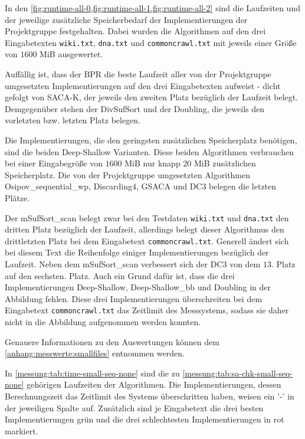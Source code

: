 %
%

In den \cref{fig:runtime-all-0,fig:runtime-all-1,fig:runtime-all-2} sind die Laufzeiten und der jeweilige zusätzliche Speicherbedarf der Implementierungen der Projektgruppe festgehalten. Dabei wurden die Algorithmen auf den drei Eingabetexten \texttt{wiki.txt}, \texttt{dna.txt} und \texttt{commoncrawl.txt} mit jeweils einer Größe von $1600$ MiB ausgewertet.

Auffällig ist, dass der BPR die beste Laufzeit aller von der Projektgruppe umgesetzten Implementierungen auf den drei Eingabetexten aufweist - dicht gefolgt von SACA-K, der jeweils den zweiten Platz bezüglich der Laufzeit belegt. Demgegenüber stehen der DivSufSort und der Doubling, die jeweils den vorletzten bzw. letzten Platz belegen.

Die Implementierungen, die den geringsten zusätzlichen Speicherplatz benötigen, sind die beiden Deep-Shallow Varianten. Diese beiden Algorithmen verbrauchen bei einer Eingabegröße von $1600$ MiB nur knapp $20$ MiB zusätzlichen Speicherplatz. Die von der Projektgruppe umgesetzten Algorithmen Osipov\_sequential\_wp, Discarding4, GSACA und DC3 belegen die letzten Plätze.

Der mSufSort\_scan belegt zwar bei den Testdaten \texttt{wiki.txt} und \texttt{dna.txt} den dritten Platz bezüglich der Laufzeit, allerdings belegt dieser Algorithmus den drittletzten Platz bei dem Eingabetext \texttt{commoncrawl.txt}. Generell ändert sich bei diesem Text die Reihenfolge einiger Implementierungen bezüglich der Laufzeit. Neben dem mSufSort\_scan verbessert sich der DC3 von dem $13$. Platz auf den sechsten. Platz. Auch ein Grund dafür ist, dass die drei Implementierungen Deep-Shallow, Deep-Shallow\_bb und Doubling in der Abbildung fehlen. Diese drei Implementierungen überschreiten bei dem Eingabetext \texttt{commoncrawl.txt} das Zeitlimit des Messsystems, sodass sie daher nicht in die Abbildung aufgenommen werden konnten.

Genauere Informationen zu den Auswertungen können dem \cref{anhang:messwerte:smallfiles} entnommen werden.

In \cref{messung:tab:time-small-seq-none} sind die zu \cref{messung:tab:sa-chk-small-seq-none} gehörigen Laufzeiten der Algorithmen. Die Implementierungen, dessen Berechnungszeit das Zeitlimit des Systems überschritten haben, weisen ein '-' in der jeweiligen Spalte auf. Zusätzlich sind je Eingabetext die drei besten Implementierungen grün und die drei schlechtesten Implementierungen in rot markiert.

